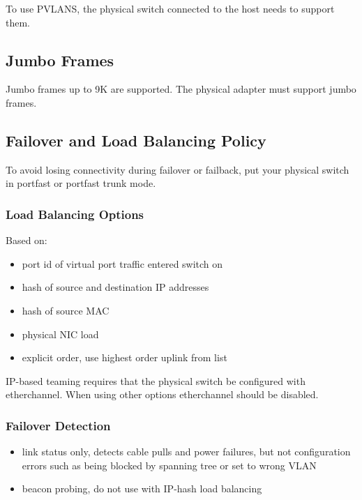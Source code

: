 \documentclass{article}
\begin{document}
To use PVLANS, the physical switch connected to the host needs to support them.

\subsection{Jumbo Frames}

Jumbo frames up to 9K are supported. The physical adapter must support jumbo
frames.

\subsection{Failover and Load Balancing Policy}

To avoid losing connectivity during failover or failback, put your physical
switch in portfast or portfast trunk mode.

\subsubsection{Load Balancing Options}

Based on:

\begin{itemize}
\item port id of virtual port traffic entered switch on
\item hash of source and destination IP addresses
\item hash of source MAC
\item physical NIC load
\item explicit order, use highest order uplink from list
\end{itemize}

IP-based teaming requires that the physical switch be configured with
etherchannel. When using other options etherchannel should be disabled.

\subsubsection{Failover Detection}

\begin{itemize}

\item link status only, detects cable pulls and power failures, but not
configuration errors such as being blocked by spanning tree or set to wrong VLAN

\item beacon probing, do not use with IP-hash load balancing

\end{itemize}
\end{document}
